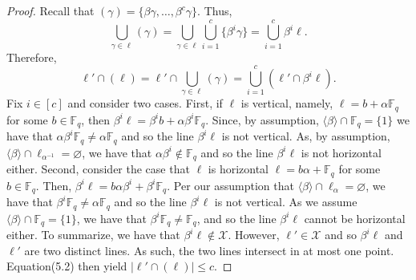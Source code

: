 \documentclass[10pt,a4paper]{article}
\begin{document}
\begin{proof}
Recall that $(\gamma)=\{\beta\gamma,\ldots,\beta^c\gamma\}$. Thus,
\[\bigcup_{\gamma\in\ell}(\gamma)=\bigcup_{\gamma\in\ell}\bigcup_{i=1}^c\{\beta^i\gamma\}=\bigcup_{i=1}^c\beta^i\ell.\]
Therefore,
\begin{equation}\ell'\cap(\ell)=\ell'\cap\bigcup_{\gamma\in\ell}(\gamma)=\bigcup_{i=1}^c(\ell'\cap\beta^i\ell).\tag{5.2}\end{equation}
Fix $i\in[c]$ and consider two cases. First, if $\ell$ is vertical, namely, $\ell=b+\alpha\mathbb F_q$ for some $b\in\mathbb F_q$, then $\beta^i\ell=\beta^ib+\alpha\beta^i\mathbb F_q$. Since, by assumption, $\langle\beta\rangle\cap\mathbb F_q=\{1\}$ we have that $\alpha\beta^i\mathbb F_q\ne\alpha\mathbb F_q$ and so the line $\beta^i\ell$ is not vertical. As, by assumption, $\langle\beta\rangle\cap\ell_{\alpha^{-1}}=\varnothing$, we have that $\alpha\beta^i\notin\mathbb F_q$ and so the line $\beta^i\ell$ is not horizontal either.
Second, consider the case that $\ell$ is horizontal $\ell=b\alpha+\mathbb F_q$ for some $b\in\mathbb F_q$. Then, $\beta^i\ell=b\alpha\beta^i+\beta^i\mathbb F_q$. Per our assumption that $\langle\beta\rangle\cap\ell_\alpha=\varnothing$, we have that $\beta^i\mathbb F_q\ne\alpha\mathbb F_q$ and so the line $\beta^i\ell$ is not vertical. As we assume $\langle\beta\rangle\cap\mathbb F_q=\{1\}$, we have that $\beta^i\mathbb F_q\ne\mathbb F_q$, and so the line $\beta^i\ell$ cannot be horizontal either. To summarize, we have that $\beta^i\ell\notin\mathcal X$. However, $\ell'\in\mathcal X$ and so $\beta^i\ell$ and $\ell'$ are two distinct lines. As such, the two lines intersect in at most one point. Equation(5.2) then yield $|\ell'\cap(\ell)|\leq c$.
\end{proof}
\end{document}
